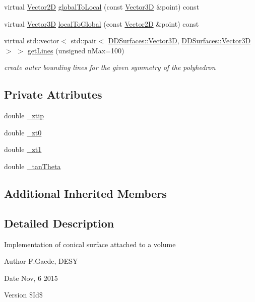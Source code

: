 \begin{DoxyCompactItemize}
\item 
virtual \hyperlink{class_d_d_surfaces_1_1_vector2_d}{Vector2D} \hyperlink{class_d_d4hep_1_1_d_d_rec_1_1_vol_cone_impl_ae45867d32eb1958d209f1e1670620976}{global\+To\+Local} (const \hyperlink{class_d_d_surfaces_1_1_vector3_d}{Vector3D} \&point) const
\item 
virtual \hyperlink{class_d_d_surfaces_1_1_vector3_d}{Vector3D} \hyperlink{class_d_d4hep_1_1_d_d_rec_1_1_vol_cone_impl_af32c1efbead53b381287c82e3ce23755}{local\+To\+Global} (const \hyperlink{class_d_d_surfaces_1_1_vector2_d}{Vector2D} \&point) const
\item 
virtual std\+::vector$<$ std\+::pair$<$ \hyperlink{class_d_d_surfaces_1_1_vector3_d}{D\+D\+Surfaces\+::\+Vector3D}, \hyperlink{class_d_d_surfaces_1_1_vector3_d}{D\+D\+Surfaces\+::\+Vector3D} $>$ $>$ \hyperlink{class_d_d4hep_1_1_d_d_rec_1_1_vol_cone_impl_ae644bf91eb0b033f16ac4d89d00dd080}{get\+Lines} (unsigned n\+Max=100)
\begin{DoxyCompactList}\small\item\em create outer bounding lines for the given symmetry of the polyhedron \end{DoxyCompactList}\end{DoxyCompactItemize}
\subsection*{Private Attributes}
\begin{DoxyCompactItemize}
\item 
double \hyperlink{class_d_d4hep_1_1_d_d_rec_1_1_vol_cone_impl_ae42d0cc1db6c972c012f3177cdeb935b}{\+\_\+ztip}
\item 
double \hyperlink{class_d_d4hep_1_1_d_d_rec_1_1_vol_cone_impl_ad204cc67411301eaa8f135430392a55c}{\+\_\+zt0}
\item 
double \hyperlink{class_d_d4hep_1_1_d_d_rec_1_1_vol_cone_impl_aa9466fe65e7238bf90ec604132ea1825}{\+\_\+zt1}
\item 
double \hyperlink{class_d_d4hep_1_1_d_d_rec_1_1_vol_cone_impl_a5f020df8481dcc088af7a02632f03ae2}{\+\_\+tan\+Theta}
\end{DoxyCompactItemize}
\subsection*{Additional Inherited Members}


\subsection{Detailed Description}
Implementation of conical surface attached to a volume \begin{DoxyAuthor}{Author}
F.\+Gaede, D\+E\+SY 
\end{DoxyAuthor}
\begin{DoxyDate}{Date}
Nov, 6 2015 
\end{DoxyDate}
\begin{DoxyVersion}{Version}
\$\+Id\$ 
\end{DoxyVersion}


